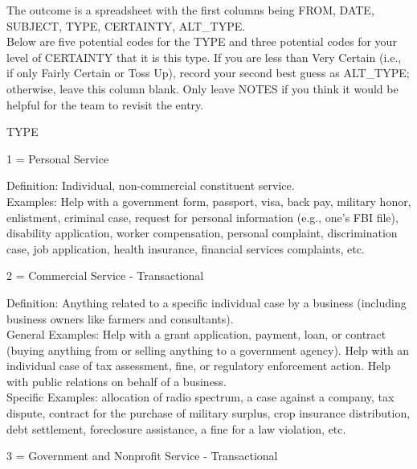 The outcome is a spreadsheet with the first columns being FROM, DATE, SUBJECT, TYPE, CERTAINTY, ALT\_TYPE.\\


Below are five potential codes for the TYPE and three potential codes for your level of CERTAINTY that it is this type. If you are less than Very Certain (i.e., if only Fairly Certain or Toss Up), record your second best guess as ALT\_TYPE; otherwise, leave this column blank. Only leave NOTES if you think it would be helpful for the team to revisit the entry.

TYPE

1 = Personal Service\\

\hfill\begin{minipage}{\dimexpr\textwidth-2cm}
Definition: Individual, non-commercial constituent service.\\
Examples: Help with a government form, passport, visa, back pay, military honor, enlistment, criminal case, request for personal information (e.g., one’s FBI file), disability application, worker compensation, personal complaint, discrimination case, job application, health insurance, financial services complaints, etc.\\
\end{minipage}

2 = Commercial Service - Transactional \\

\hfill\begin{minipage}{\dimexpr\textwidth-2cm}
Definition: Anything related to a specific individual case by a business (including business owners like farmers and consultants).\\ 
General Examples: Help with a grant application, payment, loan, or contract (buying anything from or selling anything to a government agency). Help with an individual case of tax assessment, fine, or regulatory enforcement action. Help with public relations on behalf of a business.\\
Specific Examples: allocation of radio spectrum, a case against a company, tax dispute, contract for the purchase of military surplus, crop insurance distribution, debt settlement, foreclosure assistance, a fine for a law violation, etc. \\
\end{minipage}

3 = Government and Nonprofit Service - Transactional\\

